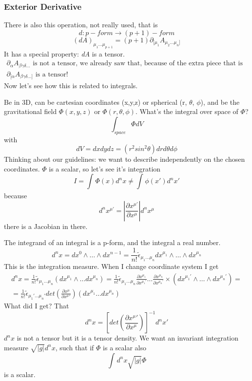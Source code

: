 \subsubsection{Exterior Derivative}
There is also this operation, not really used, that is
\[
d : p-form \to \left( p+1 \right)-form
\]
\[
	\left( dA \right)_{\mu _{1}\ldots \mu _{p+1} } = \left( p+1 \right) \partial_{[\mu _{1}}A_{\mu _{2}\ldots \mu _{n}]}
\]
It has a special property: \emph{dA} is a tensor.
\begin{gather}
\partial_{\alpha }A_{\beta  \gamma  \delta \ldots } \text{ is not a tensor, we already saw that, because of the extra piece that is symmetric and become 0 by anti-symmetrization }\\
\partial_{[\alpha }A_{\beta  \gamma  \delta  \ldots ]} \text{ is a tensor! }
\end{gather}
Now let's see how this is related to integrals.\par
Be in 3D, can be cartesian coordinates (x,y,z) or spherical (r, $\theta $, $\phi $), and be the gravitational field $\Phi\left( x,y,z \right)$ or $\Phi \left( r,\theta ,\phi  \right)$. What's the integral over space of $\Phi $?
\[
\int_{space}^{}{\Phi dV}
\]
with 
\[
dV = dxdydz = \left( r^{2}sin^{2}\theta  \right)drd\theta d\phi 
\]
Thinking about our guidelines: we want to describe independently on the chosen coordinates. $\Phi $ is a scalar, so let's see it's integration
\[
I = \int_{}^{}{\Phi \left( x \right) d^{n}x} \neq \int_{}^{}{\phi \left( x' \right)d^{n}x'}
\]
because
\[
d^{n}x^{\mu '} = \left| \frac{\partial x^{\mu '}}{\partial x^{\mu }}\right| d^{n}x^{\mu }
\]
there is a Jacobian in there.\par
The integrand of an integral is a p-form, and the integral a real number.
\[
d^{n}x = dx^{0}\wedge \ldots  \wedge dx^{n-1} = \frac{1}{n!} \tilde{\epsilon }_{\mu_{1}\ldots \mu _{n}}dx^{\mu _{1}} \wedge \ldots \wedge dx^{\mu _{n}}
\]
This is the integration measure. When I change coordinate system I get
\begin{gather}
d^{n}x = \frac{1}{n!} \tilde{\epsilon}_{\mu_{1}\ldots \mu _{n}} \left( dx^{\mu _{1}} \wedge \ldots dx^{\mu _{n}} \right) = \frac{1}{n!}\tilde{\epsilon }_{\mu _{1}\ldots \mu _{n}} \frac{\partial x^{\mu _{1}}}{\partial x^{\mu _{1}'}} \ldots \frac{\partial x^{\mu _{n}}}{\partial x^{\mu _{n}'}} \times \left( dx^{\mu _{1}'} \wedge \ldots \wedge dx^{\mu _{n}'} \right) = \\
= \frac{1}{n!} \tilde{\epsilon }_{\mu _{1}' \ldots \mu_{n}'} det\left( \frac{\partial x^{\mu }}{\partial x^{\mu }'}  \right)\left( dx^{\mu_{1}}\ldots dx^{\mu _{n}} \right)
\end{gather}
What did I get? That 
\[
	d^{n}x = \left[ det\left( \frac{\partial x^{\mu }'}{\partial x^{\mu }}  \right)\right]^{-1} d^{n}x'
\]
$d^{n}x$ is not a tensor but it is a tensor density.
We want an invariant integration measure $\sqrt{|g|}d^{n}x$, such that if $\Phi $ is a scalar also
\[
	\int_{}^{}{d^{n}x \sqrt{|g|}\Phi }
\]
is a scalar.\par

